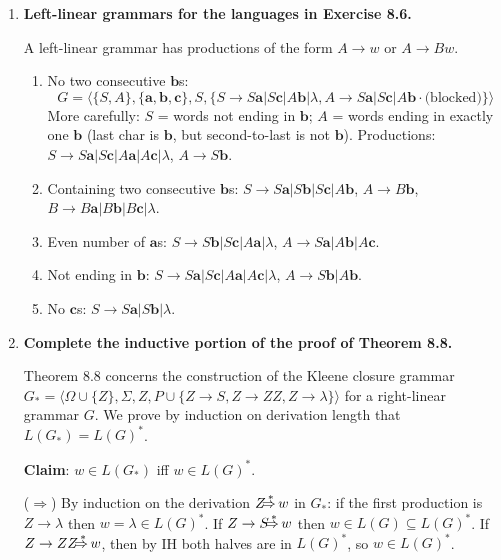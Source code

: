\begin{enumerate}[{8.}1. ]
\item \textbf{Left-linear grammars for the languages in Exercise 8.6.}

A left-linear grammar has productions of the form $A \to w$ or $A \to Bw$.

\begin{enumerate}
\item No two consecutive $\pmb{b}$s:
\[
G = \langle\{S,A\},\{\pmb{a},\pmb{b},\pmb{c}\},S,\{S\to S\pmb{a}|S\pmb{c}|A\pmb{b}|\lambda,
A\to S\pmb{a}|S\pmb{c}|A\pmb{b}\cdot\text{(blocked)}\}\rangle
\]
More carefully: $S$ = words not ending in $\pmb{b}$; $A$ = words ending in exactly one $\pmb{b}$ (last char is $\pmb{b}$, but second-to-last is not $\pmb{b}$). Productions: $S \to S\pmb{a}|S\pmb{c}|A\pmb{a}|A\pmb{c}|\lambda$, $A \to S\pmb{b}$.

\item Containing two consecutive $\pmb{b}$s: $S \to S\pmb{a}|S\pmb{b}|S\pmb{c}|A\pmb{b}$, $A \to B\pmb{b}$, $B \to B\pmb{a}|B\pmb{b}|B\pmb{c}|\lambda$.

\item Even number of $\pmb{a}$s: $S \to S\pmb{b}|S\pmb{c}|A\pmb{a}|\lambda$, $A \to S\pmb{a}|A\pmb{b}|A\pmb{c}$.

\item Not ending in $\pmb{b}$: $S \to S\pmb{a}|S\pmb{c}|A\pmb{a}|A\pmb{c}|\lambda$, $A \to S\pmb{b}|A\pmb{b}$.

\item No $\pmb{c}$s: $S \to S\pmb{a}|S\pmb{b}|\lambda$.
\end{enumerate}

\item \textbf{Complete the inductive portion of the proof of Theorem 8.8.}

Theorem 8.8 concerns the construction of the Kleene closure grammar $G_* = \langle\Omega\cup\{Z\},\Sigma,Z,P\cup\{Z\to S,Z\to ZZ,Z\to\lambda\}\rangle$ for a right-linear grammar $G$. We prove by induction on derivation length that $L(G_*) = L(G)^*$.

\textbf{Claim}: $w \in L(G_*)$ iff $w \in L(G)^*$.

($\Rightarrow$) By induction on the derivation $Z \DRightarrow w$ in $G_*$: if the first production is $Z \to \lambda$ then $w = \lambda \in L(G)^*$. If $Z \to S \DRightarrow w$ then $w \in L(G) \subseteq L(G)^*$. If $Z \to ZZ \DRightarrow w$, then by IH both halves are in $L(G)^*$, so $w \in L(G)^*$.


\end{enumerate}
